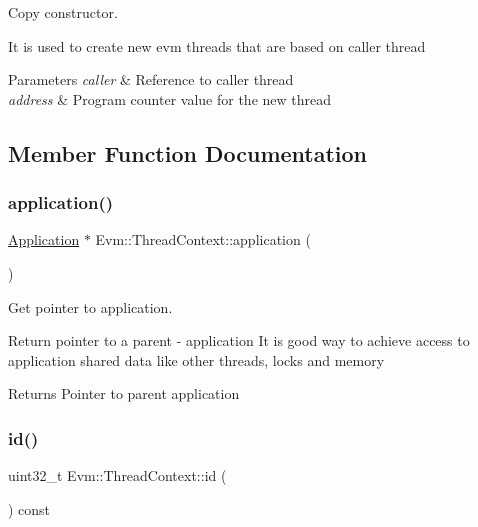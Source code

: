 Copy constructor. 

It is used to create new evm threads that are based on caller thread 
\begin{DoxyParams}{Parameters}
{\em caller} & Reference to caller thread \\
\hline
{\em address} & Program counter value for the new thread \\
\hline
\end{DoxyParams}


\subsection{Member Function Documentation}
\mbox{\label{struct_evm_1_1_thread_context_ace9600627e2e504650735d1c132897ad}} 
\subsubsection{\texorpdfstring{application()}{application()}}
{\footnotesize\ttfamily \mbox{\hyperlink{struct_evm_1_1_application}{Application}} $\ast$ Evm\+::\+Thread\+Context\+::application (\begin{DoxyParamCaption}{ }\end{DoxyParamCaption})}



Get pointer to application. 

Return pointer to a parent -\/ application It is good way to achieve access to application shared data like other threads, locks and memory \begin{DoxyReturn}{Returns}
Pointer to parent application 
\end{DoxyReturn}
\mbox{\label{struct_evm_1_1_thread_context_a55937dfacd5c99758e21d3ad1a233248}} 
\subsubsection{\texorpdfstring{id()}{id()}}
{\footnotesize\ttfamily uint32\+\_\+t Evm\+::\+Thread\+Context\+::id (\begin{DoxyParamCaption}{ }\end{DoxyParamCaption}) const}



